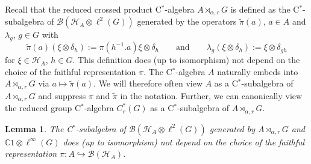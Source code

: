 \documentclass[a4paper,11pt,reqno]{amsart}
\numberwithin{equation}{section}
\numberwithin{equation}{section}
\newtheorem{lemma}[theorem]{Lemma}
\theoremstyle{definition}
\theoremstyle{remark}
\theoremstyle{remark}
\begin{document}
Recall that the reduced crossed product C$^{\ast}$-algebra $A\rtimes_{\alpha,r}G$
is defined as the C$^{\ast}$-subalgebra of $\mathcal{B}(\mathcal{H}_{A}\otimes\ell^{2}(G))$
generated by the operators $\widetilde{\pi}(a)$, $a\in A$ and $\lambda_{g}$,
$g\in G$ with 
\[
\widetilde{\pi}(a)(\xi\otimes\delta_{h}):=\pi(h^{-1}.a)\xi\otimes\delta_{h}\qquad\text{and}\qquad\lambda_{g}(\xi\otimes\delta_{h}):=\xi\otimes\delta_{gh}
\]
for $\xi\in\mathcal{H}_{A}$, $h\in G$. This definition does (up to isomorphism)
not depend on the choice of the faithful representation $\pi$. The
C$^{\ast}$-algebra $A$ naturally embeds into $A\rtimes_{\alpha,r}G$
via $a\mapsto\widetilde{\pi}(a)$. We will therefore often view $A$
as a C$^{\ast}$-subalgebra of $A\rtimes_{\alpha,r}G$ and suppress
$\pi$ and $\widetilde{\pi}$ in the notation. Further, we can canonically
view the reduced group C$^\ast$-algebra $C_{r}^{\ast}(G)$ as a C$^{\ast}$-subalgebra of $A\rtimes_{\alpha,r}G$.

\begin{lemma} \label{Independence} The C$^{\ast}$-subalgebra of
$\mathcal{B}(\mathcal{H}_{A}\otimes\ell^{2}(G))$ generated by $A\rtimes_{\alpha,r}G$ and
$\mathbb{C}1\otimes\ell^{\infty}(G)$
does (up to isomorphism) not depend on the choice of the faithful
representation $\pi:A\hookrightarrow\mathcal{B}(\mathcal{H}_{A})$.
\end{lemma}
\end{document}
